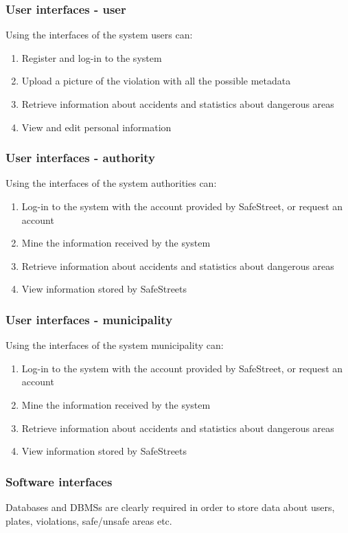 \subsubsection{User interfaces - user}
	Using the interfaces of the system users can:
	\begin{enumerate}
		\item Register and log-in to the system
		\item Upload a picture of the violation with all the possible metadata
		\item Retrieve information about accidents and statistics about dangerous areas
		\item View and edit personal information
	\end{enumerate}
	
\subsubsection{User interfaces - authority}
	Using the interfaces of the system authorities can:
	\begin{enumerate}
		\item Log-in to the system with the account provided by SafeStreet, or request an account
		\item Mine the information received by the system
		\item Retrieve information about accidents and statistics about dangerous areas
		\item View information stored by SafeStreets
	\end{enumerate}

\subsubsection{User interfaces - municipality}
	Using the interfaces of the system municipality can:
	\begin{enumerate}
		\item Log-in to the system with the account provided by SafeStreet, or request an account
		\item Mine the information received by the system
		\item Retrieve information about accidents and statistics about dangerous areas
		\item View information stored by SafeStreets
	\end{enumerate}
	
\subsubsection{Software interfaces}
Databases and DBMSs are clearly required in order to store data about users, plates, violations, safe/unsafe areas etc.


